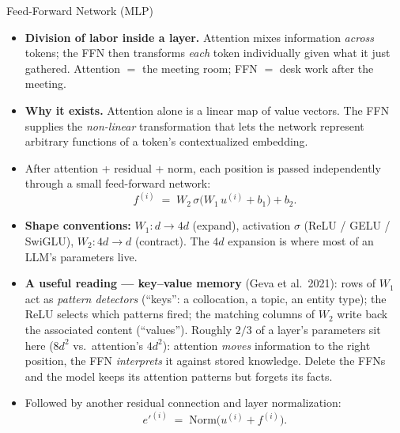 \begin{frame}{Feed-Forward Network (MLP)}
\begin{itemize}
\item \textbf{Division of labor inside a layer.} Attention mixes information \emph{across} tokens; the FFN then transforms \emph{each} token individually given what it just gathered. Attention $=$ the meeting room; FFN $=$ desk work after the meeting.

\medskip
\item \textbf{Why it exists.} Attention alone is a linear map of value vectors. The FFN supplies the \emph{non-linear} transformation that lets the network represent arbitrary functions of a token's contextualized embedding.

\medskip
\item After attention + residual + norm, each position is passed independently through a small feed-forward network:
\[
   f^{(i)} \;=\; W_{2}\,\sigma\bigl(W_{1}\,u^{(i)} + b_{1}\bigr) + b_{2}.
\]

\medskip
\item \textbf{Shape conventions:} $W_{1}\colon d \!\rightarrow\! 4d$ (expand), activation $\sigma$ (ReLU / GELU / SwiGLU), $W_{2}\colon 4d \!\rightarrow\! d$ (contract). The $4d$ expansion is where most of an LLM's parameters live.

\medskip
\item \textbf{A useful reading --- key--value memory} (Geva et al.\ 2021): rows of $W_1$ act as \emph{pattern detectors} (``keys'': a collocation, a topic, an entity type); the ReLU selects which patterns fired; the matching columns of $W_2$ write back the associated content (``values''). Roughly $2/3$ of a layer's parameters sit here ($8d^2$ vs.\ attention's $4d^2$): attention \emph{moves} information to the right position, the FFN \emph{interprets} it against stored knowledge. Delete the FFNs and the model keeps its attention patterns but forgets its facts.

\medskip
\item Followed by another residual connection and layer normalization:
\[
   e'^{(i)} \;=\; \mathrm{Norm}\bigl(u^{(i)} + f^{(i)}\bigr).
\]
\end{itemize}
\end{frame}

